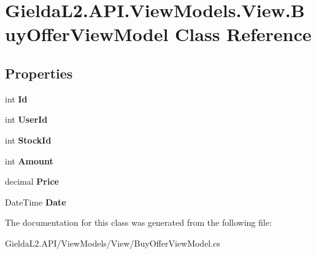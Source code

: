 \hypertarget{class_gielda_l2_1_1_a_p_i_1_1_view_models_1_1_view_1_1_buy_offer_view_model}{}\section{Gielda\+L2.\+A\+P\+I.\+View\+Models.\+View.\+Buy\+Offer\+View\+Model Class Reference}
\label{class_gielda_l2_1_1_a_p_i_1_1_view_models_1_1_view_1_1_buy_offer_view_model}
\subsection*{Properties}
\begin{DoxyCompactItemize}
\item 
\mbox{\label{class_gielda_l2_1_1_a_p_i_1_1_view_models_1_1_view_1_1_buy_offer_view_model_a362aacc23355eef1a4d2943cf9059315}} 
int {\bfseries Id}
\item 
\mbox{\label{class_gielda_l2_1_1_a_p_i_1_1_view_models_1_1_view_1_1_buy_offer_view_model_a3ddad03664b840ebdc9f7c0054e24090}} 
int {\bfseries User\+Id}
\item 
\mbox{\label{class_gielda_l2_1_1_a_p_i_1_1_view_models_1_1_view_1_1_buy_offer_view_model_a37038963cd1e0a6bf2e7e40d87311b16}} 
int {\bfseries Stock\+Id}
\item 
\mbox{\label{class_gielda_l2_1_1_a_p_i_1_1_view_models_1_1_view_1_1_buy_offer_view_model_ac654a7a6961b45b0a164f5c3bdfa00c1}} 
int {\bfseries Amount}
\item 
\mbox{\label{class_gielda_l2_1_1_a_p_i_1_1_view_models_1_1_view_1_1_buy_offer_view_model_a2a5416ad56b0fdc351b6aa4ab2607ec7}} 
decimal {\bfseries Price}
\item 
\mbox{\label{class_gielda_l2_1_1_a_p_i_1_1_view_models_1_1_view_1_1_buy_offer_view_model_ada2be83af01ba13017549cb60d8f858a}} 
Date\+Time {\bfseries Date}
\end{DoxyCompactItemize}


The documentation for this class was generated from the following file\+:\begin{DoxyCompactItemize}
\item 
Gielda\+L2.\+A\+P\+I/\+View\+Models/\+View/Buy\+Offer\+View\+Model.\+cs\end{DoxyCompactItemize}

